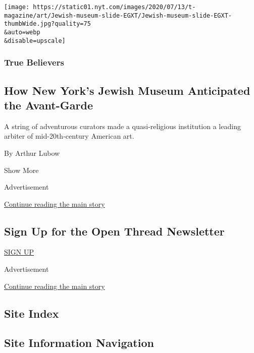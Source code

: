 \begin{enumerate}
  \texttt{[image: https://static01.nyt.com/images/2020/07/13/t-magazine/art/Jewish-museum-slide-EGXT/Jewish-museum-slide-EGXT-thumbWide.jpg?quality=75\\\&auto=webp\\\&disable=upscale]}

  \hypertarget{true-believers-3}{%
  \subsubsection{True Believers}\label{true-believers-3}}

  \hypertarget{how-new-yorks-jewish-museum-anticipated-the-avant-garde}{%
  \subsection{How New York's Jewish Museum Anticipated the
  Avant-Garde}\label{how-new-yorks-jewish-museum-anticipated-the-avant-garde}}

  A string of adventurous curators made a quasi-religious institution a
  leading arbiter of mid-20th-century American art.

  By Arthur Lubow
\end{enumerate}

Show More

Advertisement

\protect\hyperlink{after-mid2}{Continue reading the main story}

\hypertarget{sign-up-for-the-open-thread-newsletter}{%
\subsection{Sign Up for the Open Thread
Newsletter}\label{sign-up-for-the-open-thread-newsletter}}

\href{/newsletters/signup/TZ}{SIGN UP}

Advertisement

\protect\hyperlink{after-mktg}{Continue reading the main story}

\hypertarget{site-index}{%
\subsection{Site Index}\label{site-index}}

\hypertarget{site-information-navigation}{%
\subsection{Site Information
Navigation}\label{site-information-navigation}}


